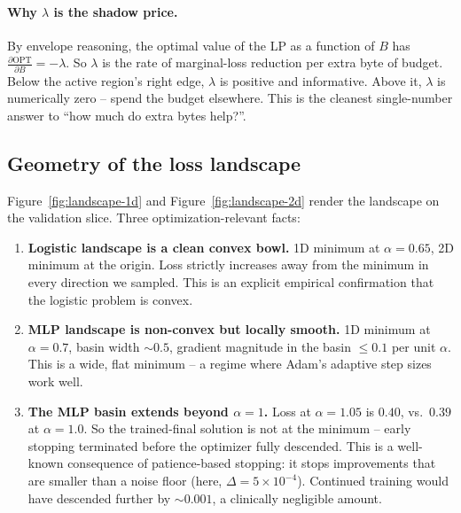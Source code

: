 \paragraph{Why $\lambda$ is the shadow price.} By envelope reasoning, the
optimal value of the LP as a function of $B$ has $\frac{\partial \mathrm{OPT}}{\partial B}
= -\lambda$. So $\lambda$ is the rate of marginal-loss reduction per extra
byte of budget. Below the active region's right edge, $\lambda$ is positive
and informative. Above it, $\lambda$ is numerically zero -- spend the budget
elsewhere. This is the cleanest single-number answer to ``how much do extra
bytes help?''.

\subsection{Geometry of the loss landscape}
Figure~\ref{fig:landscape-1d} and Figure~\ref{fig:landscape-2d} render the
landscape on the validation slice. Three optimization-relevant facts:
\begin{enumerate}[leftmargin=*,nosep]
    \item \textbf{Logistic landscape is a clean convex bowl.} 1D minimum at
        $\alpha\!=\!0.65$, 2D minimum at the origin. Loss strictly increases
        away from the minimum in every direction we sampled. This is an
        explicit empirical confirmation that the logistic problem is convex.
    \item \textbf{MLP landscape is non-convex but locally smooth.} 1D minimum
        at $\alpha\!=\!0.7$, basin width $\sim 0.5$, gradient magnitude in the
        basin $\leq 0.1$ per unit $\alpha$. This is a wide, flat minimum -- a
        regime where Adam's adaptive step sizes work well.
    \item \textbf{The MLP basin extends beyond $\alpha\!=\!1$.} Loss at
        $\alpha\!=\!1.05$ is $0.40$, vs.\ $0.39$ at $\alpha\!=\!1.0$. So the
        trained-final solution is not at the minimum -- early stopping
        terminated before the optimizer fully descended. This is a well-known
        consequence of patience-based stopping: it stops improvements that are
        smaller than a noise floor (here, $\Delta\!=\!5\!\times\!10^{-4}$).
        Continued training would have descended further by $\sim 0.001$, a
        clinically negligible amount.
\end{enumerate}

